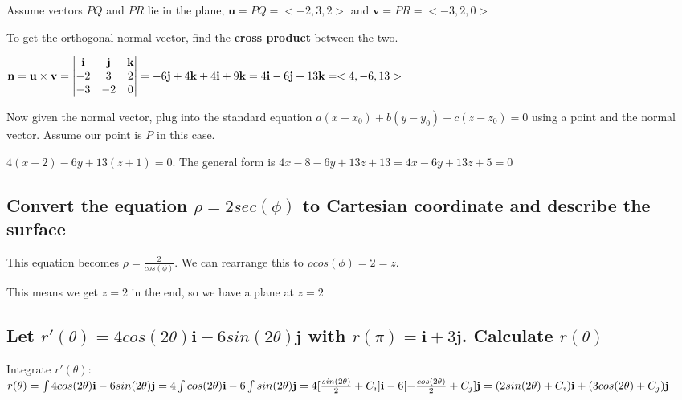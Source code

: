 \documentclass{article}
\begin{document}
\par\noindent\large Assume vectors $PQ$ and $PR$ lie in the plane, $\textbf{u} = PQ = <-2, 3, 2>$ and $\textbf{v} = PR = <-3, 2, 0>$

\par\noindent\large To get the orthogonal normal vector, find the \textbf{cross product} between the two.
\begin{center}
$\textbf{n} = \textbf{u} \times \textbf{v} = \begin{vmatrix}
\textbf{i} & \textbf{j} & \textbf{k} \\ 
-2 & 3 & 2 \\ 
-3 & -2 & 0  \notag
\end{vmatrix} = -6\textbf{j} + 4\textbf{k} + 4\textbf{i} + 9\textbf{k} = 4\textbf{i} - 6\textbf{j} + 13\textbf{k} = <4, -6, 13>$ \end{center}
\par\noindent\large Now given the normal vector, plug into the standard equation $a(x - x_{0}) + b(y - y_{0}) + c(z - z_{0}) = 0$ using a point and the normal vector.  Assume our point is $P$ in this case.
\par\noindent\large $4(x - 2) - 6y + 13(z + 1) = 0$.  The general form is $4x - 8 - 6y + 13z + 13 = 4x - 6y + 13z + 5 = 0$

\subsection{Convert the equation $\rho = 2sec(\phi)$ to Cartesian coordinate and describe the surface}

\par\noindent\large This equation becomes $\rho = \frac{2}{cos(\phi)}$.  We can rearrange this to $\rho cos(\phi) = 2 = z$.
\par\noindent\large This means we get $z = 2$ in the end, so we have a plane at $z = 2$

\subsection{Let $r'(\theta) = 4cos(2\theta)\textbf{i} - 6sin(2\theta)\textbf{j}$ with $r(\pi) = \textbf{i} + 3\textbf{j}$.  Calculate $r(\theta)$}
\par\noindent\large Integrate $r'(\theta)$: $r(\theta) = \int 4cos(2\theta)\textbf{i} - 6sin(2\theta)\textbf{j} = 4\int cos(2\theta)\textbf{i} - 6\int sin(2\theta)\textbf{j} = \linebreak 4[\frac{sin(2\theta)}{2} + C_{i}]\textbf{i} - 6[-\frac{cos(2\theta)}{2} + C_{j}]\textbf{j} = (2sin(2\theta) + C_{i})\textbf{i} + (3cos(2\theta) + C_{j})\textbf{j}$ \vspace{0.25cm}
\end{document}
